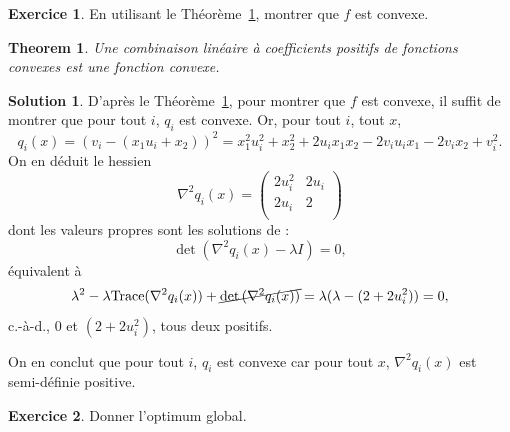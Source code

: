 \documentclass[a4paper,francais]{article}
\newcommand{\cad}{c.-à-d.}
\newtheorem{Theorem}{Theorem}
\theoremstyle{definition}
\newtheorem{exercice}{Exercice}[section]
\newtheorem*{solution}{Solution}
\begin{document}
\begin{exercice}
En utilisant le Théorème~\ref{th:fonc-conv}, montrer que $f$ est convexe.   
\end{exercice}

\begin{Theorem}
  \label{th:fonc-conv}
  Une combinaison linéaire à coefficients positifs de fonctions convexes est une fonction convexe.
\end{Theorem}

\begin{solution}
  D'après le Théorème~\ref{th:fonc-conv}, pour montrer que $f$ est convexe, il suffit de montrer que
  pour tout $i$, $q_i$ est convexe.
  Or, pour tout $i$, tout $x$,
  \[
  q_i(x) =  (v_i - (x_1u_i + x_2))^2 = x_1^2 u_i^2 + x_2^2 + 2u_ix_1x_2 - 2v_iu_ix_1 - 2v_ix_2 + v_i^2.
  \]
  On en déduit le hessien
  \[
  \nabla^2q_i(x) = 
  \left(
  \begin{array}{cc}
    2u_i^2 & 2u_i \\
    2u_i & 2 \\
  \end{array}
  \right)
  \]
  dont les valeurs propres sont les solutions de :
  \[
  \det{(\nabla^2q_i(x) - \lambda I)} = 0, 
  \]
  équivalent à
  \[
  \lambda^2 - \lambda\text{Trace}(\nabla^2q_i(x)) + \cancel{\det{(\nabla^2q_i(x))}}
  = \lambda(\lambda - (2 + 2u_i^2)) = 0, 
  \]
  {\cad}, $0$ et $(2 + 2u_i^2)$, tous deux positifs.

  On en conclut que pour tout $i$, $q_i$ est convexe car pour tout $x$,
  $\nabla^2q_i(x)$ est semi-définie positive.  
\end{solution}

\begin{exercice}
   Donner l'optimum global.
\end{exercice}
\end{document}
